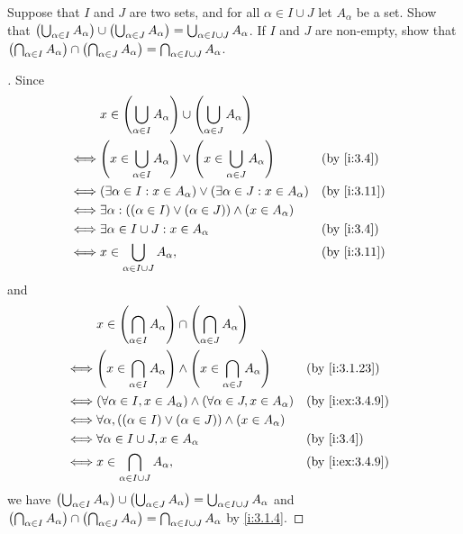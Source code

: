 \begin{ex}\label{i:ex:3.4.10}
  Suppose that \(I\) and \(J\) are two sets, and for all \(\alpha \in I \cup J\) let \(A_\alpha\) be a set.
  Show that \(\left\lparen\bigcup_{\alpha \in I} A_\alpha\right\rparen \cup \left\lparen\bigcup_{\alpha \in J} A_\alpha\right\rparen = \bigcup_{\alpha \in I \cup J} A_\alpha\).
  If \(I\) and \(J\) are non-empty, show that \(\left\lparen\bigcap_{\alpha \in I} A_\alpha\right\rparen \cap \left\lparen\bigcap_{\alpha \in J} A_\alpha\right\rparen = \bigcap_{\alpha \in I \cup J} A_\alpha\).
\end{ex}

\begin{proof}[]
  Since
  \begin{align*}
         & x \in \pa{\bigcup_{\alpha \in I} A_\alpha} \cup \pa{\bigcup_{\alpha \in J} A_\alpha}                        \\
    \iff & \pa{x \in \bigcup_{\alpha \in I} A_\alpha} \lor \pa{x \in \bigcup_{\alpha \in J} A_\alpha} &  & \by{i:3.4}  \\
    \iff & (\exists \alpha \in I : x \in A_\alpha) \lor (\exists \alpha \in J : x \in A_\alpha)       &  & \by{i:3.11} \\
    \iff & \exists \alpha : ((\alpha \in I) \lor (\alpha \in J)) \land (x \in A_\alpha)                                \\
    \iff & \exists \alpha \in I \cup J : x \in A_\alpha                                               &  & \by{i:3.4}  \\
    \iff & x \in \bigcup_{\alpha \in I \cup J} A_\alpha,                                              &  & \by{i:3.11}
  \end{align*}
  and
  \begin{align*}
         & x \in \pa{\bigcap_{\alpha \in I} A_\alpha} \cap \pa{\bigcap_{\alpha \in J} A_\alpha}                             \\
    \iff & \pa{x \in \bigcap_{\alpha \in I} A_\alpha} \land \pa{x \in \bigcap_{\alpha \in J} A_\alpha} &  & \by{i:3.1.23}   \\
    \iff & (\forall \alpha \in I, x \in A_\alpha) \land (\forall \alpha \in J, x \in A_\alpha)         &  & \by{i:ex:3.4.9} \\
    \iff & \forall \alpha, ((\alpha \in I) \lor (\alpha \in J)) \land (x \in A_\alpha)                                      \\
    \iff & \forall \alpha \in I \cup J, x \in A_\alpha                                                 &  & \by{i:3.4}      \\
    \iff & x \in \bigcap_{\alpha \in I \cup J} A_\alpha,                                               &  & \by{i:ex:3.4.9}
  \end{align*}
  we have \(\left\lparen\bigcup_{\alpha \in I} A_\alpha\right\rparen \cup \left\lparen\bigcup_{\alpha \in J} A_\alpha\right\rparen = \bigcup_{\alpha \in I \cup J} A_\alpha\) and \(\left\lparen\bigcap_{\alpha \in I} A_\alpha\right\rparen \cap \left\lparen\bigcap_{\alpha \in J} A_\alpha\right\rparen = \bigcap_{\alpha \in I \cup J} A_\alpha\) by \cref{i:3.1.4}.
\end{proof}

